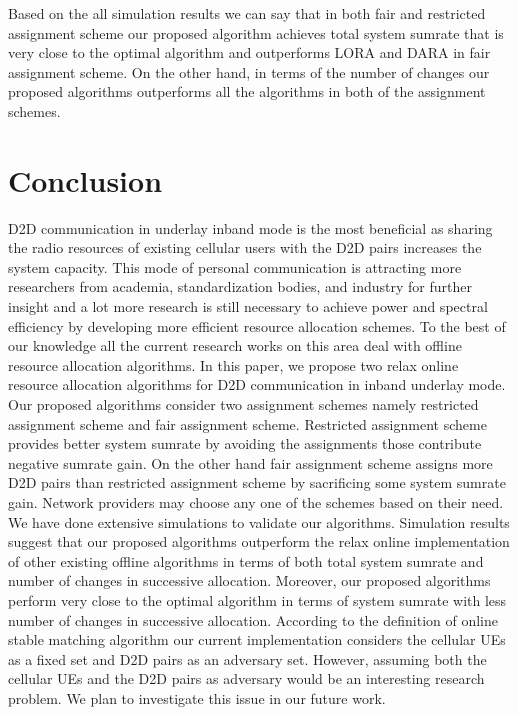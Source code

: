 \documentclass[times]{dacauth}
\begin{document}
\smallskip
\noindent
Based on the all simulation results we can say that in both fair and restricted assignment scheme our proposed algorithm achieves  total system sumrate that is very close to the optimal algorithm and outperforms LORA and DARA in fair assignment scheme. On the other hand, in terms of the number of changes our proposed algorithms outperforms all the algorithms in both of the assignment schemes.



\section{Conclusion}\label{section:Conclusion}
\smallskip
\noindent
D2D communication in underlay inband mode is the most beneficial as sharing the radio resources of existing cellular users with the D2D pairs increases the system capacity. This mode of personal communication is attracting more researchers from academia, standardization bodies, and industry for further insight and a lot more research is still necessary to achieve power and spectral efficiency by developing more efficient resource allocation schemes. To the best of our knowledge all the current research works on this area deal with offline resource allocation algorithms. 
In this paper, we propose two relax online resource allocation algorithms for D2D communication in inband underlay mode. Our proposed algorithms consider two assignment schemes namely restricted assignment scheme and fair assignment scheme. Restricted assignment scheme provides better system sumrate by avoiding the assignments those contribute negative sumrate gain. On the other hand fair assignment scheme assigns more D2D pairs than restricted assignment scheme by sacrificing some system sumrate gain. Network providers may choose any one of the schemes based on their need. We have done extensive simulations to validate our algorithms. Simulation results suggest that our proposed algorithms outperform the relax online implementation of other existing offline algorithms in terms of both total system sumrate and number of changes in successive allocation. Moreover, our proposed algorithms perform very close to the optimal algorithm in terms of system sumrate with less number of changes in successive allocation. According to the definition of online stable matching algorithm our current implementation considers the cellular UEs as a fixed set and D2D pairs as an adversary set. However, assuming both the cellular UEs and the D2D pairs as adversary would be an interesting research problem. We plan to investigate this issue in our future work.  




\end{document}
